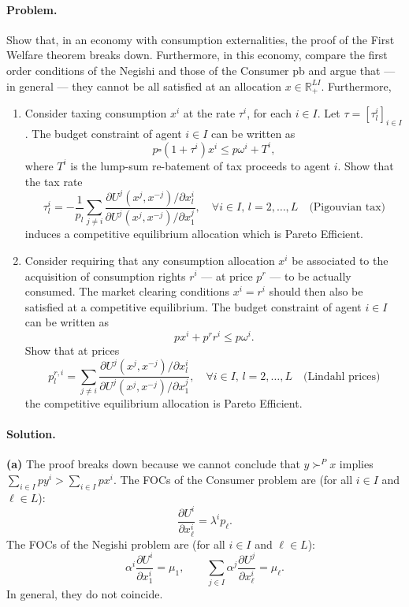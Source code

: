 \paragraph{Problem.} Show that, in an economy with consumption externalities, the proof of the First Welfare theorem breaks down. Furthermore, in this economy, compare the first order conditions of the Negishi and those of the Consumer pb and argue that --- in general --- they cannot be all satisfied at an allocation $x \in \mathbb{R}_+^{LI}$. Furthermore,
\begin{enumerate}
    \item Consider taxing consumption $x^i$ at the rate $\tau^i$, for each $i \in I$. Let $\tau = [\tau_l^i]_{i \in I}$. The budget constraint of agent $i \in I$ can be written as
    \[
        p \square (1 + \tau^i) x^i \leq p\omega^i + T^i,
    \]
    where $T^i$ is the lump-sum re-batement of tax proceeds to agent $i$. Show that the tax rate
    \[
        \tau_l^i = -\frac{1}{p_l} \sum_{j \neq i} \frac{\partial U^j(x^j, x^{-j}) / \partial x_l^i}{\partial U^j(x^j, x^{-j}) / \partial x_1^j}, \quad \forall i \in I, \, l = 2, \ldots, L \quad \text{(Pigouvian tax)}
    \]
    induces a competitive equilibrium allocation which is Pareto Efficient.
    \item Consider requiring that any consumption allocation $x^i$ be associated to the acquisition of consumption rights $r^i$ --- at price $p^r$ --- to be actually consumed. The market clearing conditions $x^i = r^i$ should then also be satisfied at a competitive equilibrium. The budget constraint of agent $i \in I$ can be written as
    \[
        p x^i + p^r r^i \leq p \omega^i.
    \]
    Show that at prices
    \[
        p_l^{r,i} = \sum_{j \neq i} \frac{\partial U^j(x^j, x^{-j}) / \partial x_l^i}{\partial U^j(x^j, x^{-j}) / \partial x_1^j}, \quad \forall i \in I, \, l = 2, \ldots, L \quad \text{(Lindahl prices)}
    \]
    the competitive equilibrium allocation is Pareto Efficient.
\end{enumerate}

\paragraph{Solution.}
\textbf{(a)} The proof breaks down because we cannot conclude that $y \succ^P x$ implies $\sum_{i \in I} p y^i > \sum_{i \in I} p x^i$. The FOCs of the Consumer problem are (for all $i \in I$ and $\ell \in L$):
\[
\frac{\partial U^i}{\partial x_\ell^i} = \lambda^i p_\ell.
\]
The FOCs of the Negishi problem are (for all $i \in I$ and $\ell \in L$):
\[
\alpha^i \frac{\partial U^i}{\partial x_1^i} = \mu_1, \qquad \sum_{j \in I} \alpha^j \frac{\partial U^j}{\partial x_\ell^i} = \mu_\ell.
\]
In general, they do not coincide.

